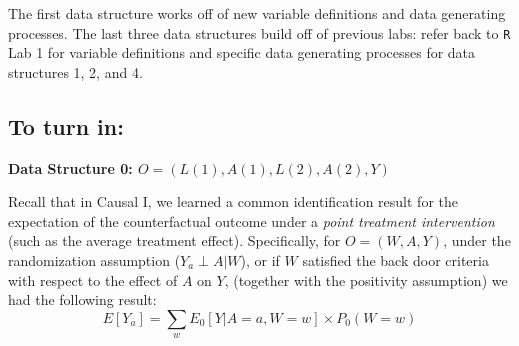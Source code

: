 \documentclass{exam}
\begin{document}
\noindent The first data structure works off of new variable definitions and data generating processes. The last three data structures build off of previous labs: refer back to \texttt{R} Lab 1 for variable definitions and specific data generating processes for data structures 1, 2, and 4.

\subsection{To turn in:}


\noindent{}

\pagebreak
\noindent\large\textbf{Data Structure 0: $O = (L(1), A(1), L(2), A(2), Y)$}
\normalsize

Recall that in Causal I, we learned a common identification result for the expectation of the counterfactual outcome under a \textit{point treatment intervention} (such as the average treatment effect). Specifically, for $O = (W, A, Y)$, under the randomization assumption ($Y_a \perp A|W$), or if $W$ satisfied the back door criteria with respect to the effect of $A$ on $Y$, (together with the positivity assumption) we had the following result:
\[
E[Y_a] = \sum_{w}E_0[Y|A=a,W=w] \times P_0(W=w)
\]
\end{document}
